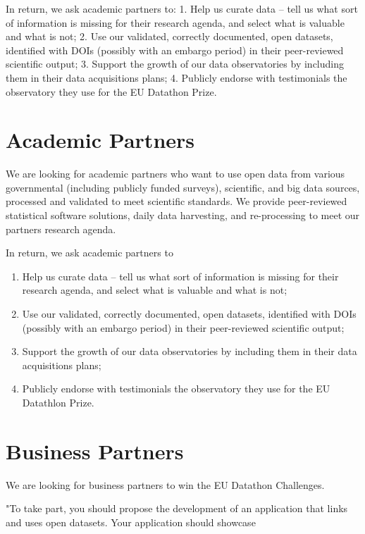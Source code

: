 \documentclass[
  a4paper,
  openany, a4paper, oneside]{book}
\providecommand{\tightlist}{%
  \setlength{\itemsep}{0pt}\setlength{\parskip}{0pt}}
\begin{document}
In return, we ask academic partners to:
1. Help us curate data -- tell us what sort of information is missing for their research agenda, and select what is valuable and what is not;
2. Use our validated, correctly documented, open datasets, identified with DOIs (possibly with an embargo period) in their peer-reviewed scientific output;
3. Support the growth of our data observatories by including them in their data acquisitions plans;
4. Publicly endorse with testimonials the observatory they use for the EU Datathon Prize.

\hypertarget{academic-partners}{%
\section{Academic Partners}\label{academic-partners}}

We are looking for academic partners who want to use open data from various governmental (including publicly funded surveys), scientific, and big data sources, processed and validated to meet scientific standards. We provide peer-reviewed statistical software solutions, daily data harvesting, and re-processing to meet our partners research agenda.

In return, we ask academic partners to

\begin{enumerate}
\def\labelenumi{\arabic{enumi}.}
\tightlist
\item
  Help us curate data -- tell us what sort of information is missing for their research agenda, and select what is valuable and what is not;
\item
  Use our validated, correctly documented, open datasets, identified with DOIs (possibly with an embargo period) in their peer-reviewed scientific output;
\item
  Support the growth of our data observatories by including them in their data acquisitions plans;
\item
  Publicly endorse with testimonials the observatory they use for the EU Datathlon Prize.
\end{enumerate}

\hypertarget{business-partners}{%
\section{Business Partners}\label{business-partners}}

We are looking for business partners to win the EU Datathon Challenges.

"To take part, you should propose the development of an application that links and uses open datasets. Your application should showcase
\end{document}
